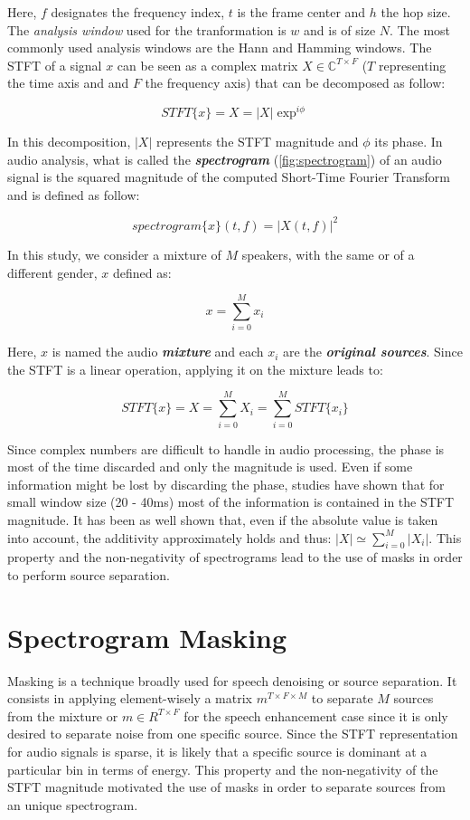 \documentclass[master, tikz, final,11pt, dvipdfmx]{iscs-thesis}
\begin{document}
Here, $f$ designates the frequency index, $t$ is the frame center and $h$ the hop size. The \textit{analysis window} used for the tranformation is $w$ and is of size $N$. The most commonly used analysis windows are the Hann and Hamming windows.
The STFT of a signal $x$ can be seen as a complex matrix $X \in \mathbb{C}^{T\times F}$ ($T$ representing the time axis and and $F$ the frequency axis) that can be decomposed as follow:

\[
	STFT\{x\} = X = |X|\exp^{i\phi}
\]

In this decomposition, $|X|$ represents the STFT magnitude and $\phi$ its phase. In audio analysis, what is called the \textit{\textbf{spectrogram}} (\autoref{fig:spectrogram}) of an audio signal is the squared magnitude of the computed Short-Time Fourier Transform and is defined as follow:

\[
	spectrogram\{x\}(t,f) =  |X(t,f)|^2
\]

In this study, we consider a mixture of $M$ speakers, with the same or of a different gender, $x$ defined as:

\[
x = \sum_{i=0}^{M} x_i
\]

Here, $x$ is named the audio \textit{\textbf{mixture}} and each $x_i$ are the \textit{\textbf{original sources}}. Since the STFT is a linear operation, applying it on the mixture leads to:

\[
	STFT\{x\} = X = \sum_{i=0}^{M} X_i =\sum_{i=0}^{M} STFT\{x_i\}
\]

Since complex numbers are difficult to handle in audio processing, the phase is most of the time discarded and only the magnitude is used. Even if some information might be lost by discarding the phase, studies \cite{stft} have shown that for small window size (20 - 40ms) most of the information is contained in the STFT magnitude. It has been as well shown that, even if the absolute value is taken into account, the additivity approximately holds and thus: $|X| \simeq \sum_{i=0}^{M} |X_i|$. This property and the non-negativity of spectrograms lead to the use of masks in order to perform source separation.


\section{Spectrogram Masking}

Masking is a technique broadly used for speech denoising or source separation. It consists in applying element-wisely a matrix $m^{T \times F \times M}$ to separate $M$ sources from the mixture or $m \in R^{T \times F}$ for the speech enhancement case since it is only desired to separate noise from one specific source. Since the STFT representation for audio signals is sparse, it is likely that a specific source is dominant at a particular bin in terms of energy. This property and the non-negativity of the STFT magnitude motivated the use of masks in order to separate sources from an unique spectrogram.
\end{document}
